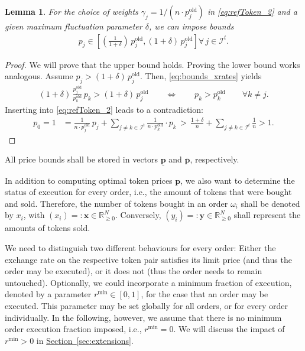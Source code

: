 \documentclass[11pt,parskip=full]{scrartcl}%
\newcommand*{\ie}{i.e., }
\newcommand*{\Min}{\mathrm{min}}
\newcommand*{\itokens}{\mathcal{I}^t}       %
\newcommand*{\secref}[1]{\hyperref[{#1}]{Section~\ref*{#1}}}
\newtheorem{lemma}[theorem]{Lemma}
\begin{document}
\begin{lemma}
  For the choice of weights $ \gamma_j = 1 / (n \cdot p_j^\mathrm{old}) $ in \eqref{eq:refToken_2}
  and a given maximum fluctuation parameter $ \delta $, we can impose bounds
  \begin{align}
    p_j \in \left[ \left(\frac{1}{1+\delta}\right) \, p^\mathrm{old}_j, (1+\delta) \,
  p^
  \mathrm{old}_j \right] \forall \, j \in \itokens.
  \end{align}
\end{lemma}
\vspace{-.5cm}
\begin{proof}
  We will prove that the upper bound holds.
  Proving the lower bound works analogous.
  Assume $ p_j > (1+\delta) \, p_j^\mathrm{old} $.
  Then, \eqref{eq:bounds_xrates} yields
  \begin{align*}
    (1+\delta) \, \frac{p^\mathrm{old}_j}{p^\mathrm{old}_k} \, p_k > (1+\delta) \, p_j^\mathrm{old}
    \qquad \Leftrightarrow \qquad p_k > p_k^\mathrm{old}
    \qquad \forall k \neq j.
  \end{align*}
  Inserting into \eqref{eq:refToken_2} leads to a contradiction:
  \begin{align*}
    p_0 = 1
    &= \frac{1}{n \cdot p_j^\mathrm{old}} \, p_j + \sum\limits_{j \neq k \in \itokens}
      \frac{1}{n \cdot p_k^\mathrm{old}} \cdot p_k
    \, > \, \frac{1+\delta}{n} + \sum\limits_{j \neq k \in \itokens} \frac{1}{n} > 1.
  \end{align*}
\end{proof}
\vspace{-.4cm}

All price bounds shall be stored in vectors $\underline{\mathbf{p}}$ and $\overline{\mathbf{p}}$,
respectively.

In addition to computing optimal token prices $\mathbf{p}$, we also want to determine the status
of execution for every order, \ie the amount of tokens that were bought and sold.
Therefore, the number of tokens bought in an order $\omega_i$ shall be denoted by $x_i$, with
$(x_i) =: \mathbf{x} \in \mathbb{R}^N_{\ge 0}$.
Conversely, $(y_i) =: \mathbf{y} \in \mathbb{R}^N_{\ge 0}$ shall represent the amounts of tokens
sold.

We need to distinguish two different behaviours for every order: Either the exchange rate
on the respective token pair satisfies its limit price (and thus the order may be executed), or it
does not (thus the order needs to remain untouched).
Optionally, we could incorporate a minimum fraction of execution, denoted by a parameter
$r^\Min \in [0,1]$, for the case that an order may be executed.
This parameter may be set globally for all orders, or for every order individually.
In the following, however, we assume that there is no minimum order execution fraction imposed,
\ie $r^\Min = 0$.
We will discuss the impact of $r^\Min>0$ in \secref{sec:extensions}.
\end{document}
